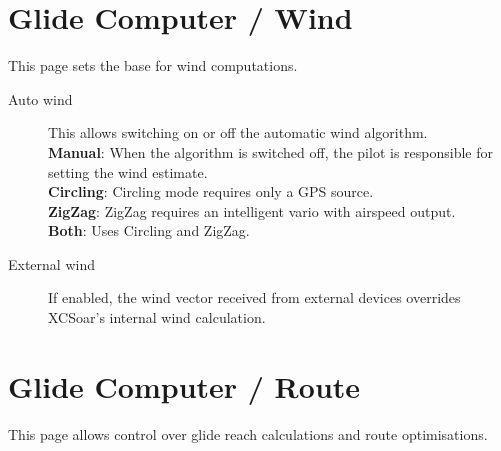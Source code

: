 \section{Glide Computer / Wind} \label{sec:wind}

This page sets the base for wind computations.

\begin{description}
\item[Auto wind]  \label{conf:autowind} This allows switching on or off the
  automatic wind algorithm. \\
  {\bf Manual}: When the algorithm is switched off, the pilot is responsible for
  setting the wind estimate. \\
  {\bf Circling}: Circling mode requires only a GPS source. \\
  {\bf ZigZag}: ZigZag requires an intelligent vario with airspeed output. \\
  {\bf Both}:  Uses Circling and ZigZag.
\item[External wind]  If enabled, the wind vector received from external
  devices overrides XCSoar's internal wind calculation.
\end{description}


\section{Glide Computer / Route}

This page allows control over glide reach calculations and route
optimisations.

